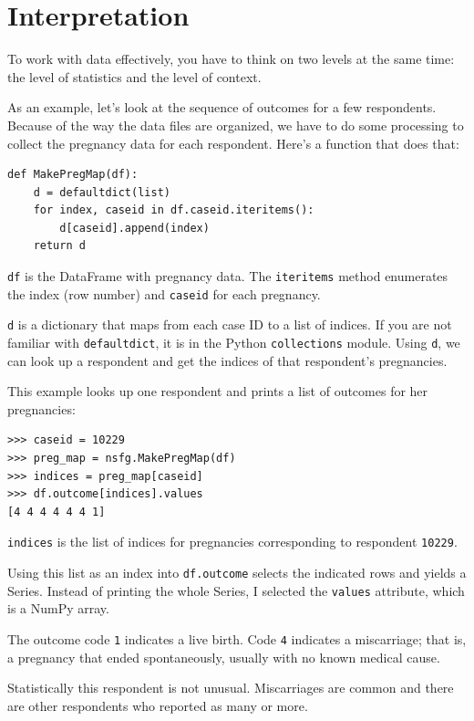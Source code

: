 \documentclass[12pt]{book}
\begin{document}
\section{Interpretation}

To work with data effectively, you have to think on two levels at the
same time: the level of statistics and the level of context.

As an example, let's look at the sequence of outcomes for a few
respondents.  Because of the way the data files are organized, we have
to do some processing to collect the pregnancy data for each respondent.
Here's a function that does that:

\begin{verbatim}
def MakePregMap(df):
    d = defaultdict(list)
    for index, caseid in df.caseid.iteritems():
        d[caseid].append(index)
    return d
\end{verbatim}

\verb"df" is the DataFrame with pregnancy data.  The \verb"iteritems"
method enumerates the index (row number)
and \verb"caseid" for each pregnancy.

\verb"d" is a dictionary that maps from each case ID to a list of
indices.  If you are not familiar with \verb"defaultdict", it is in
the Python \verb"collections" module.
Using \verb"d", we can look up a respondent and get the
indices of that respondent's pregnancies.

This example looks up one respondent and prints a list of outcomes
for her pregnancies:

\begin{verbatim}
>>> caseid = 10229
>>> preg_map = nsfg.MakePregMap(df)
>>> indices = preg_map[caseid]
>>> df.outcome[indices].values
[4 4 4 4 4 4 1]
\end{verbatim}

\verb"indices" is the list of indices for pregnancies corresponding
to respondent \verb"10229".

Using this list as an index into \verb"df.outcome" selects the
indicated rows and yields a Series.  Instead of printing the
whole Series, I selected the \verb"values" attribute, which is
a NumPy array.  

The outcome code \verb"1" indicates a live birth. Code \verb"4" indicates
a miscarriage; that is, a pregnancy that ended spontaneously, usually
with no known medical cause.

Statistically this respondent is not unusual.  Miscarriages are common
and there are other respondents who reported as many or more.
\end{document}
